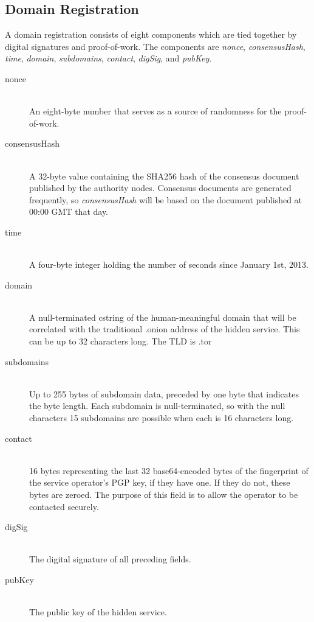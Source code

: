 \documentclass[journal]{IEEEtran}
\begin{document}


\subsection{Domain Registration}

A domain registration consists of eight components which are tied together by digital signatures and proof-of-work. The components are \textit{nonce}, \textit{consensusHash}, \textit{time}, \textit{domain}, \textit{subdomains}, \textit{contact}, \textit{digSig}, and \textit{pubKey}.

\begin{description}
	\item[nonce] \hfill \\
		An eight-byte number that serves as a source of randomness for the proof-of-work.
	\item[consensusHash] \hfill \\
		A 32-byte value containing the SHA256 hash of the consensus document published by the authority nodes. Consensus documents are generated frequently, so \textit{consensusHash} will be based on the document published at 00:00 GMT that day.
	\item[time] \hfill \\
		A four-byte integer holding the number of seconds since January 1st, 2013.
	\item[domain] \hfill \\
		A null-terminated cstring of the human-meaningful domain that will be correlated with the traditional .onion address of the hidden service. This can be up to 32 characters long. The TLD is .tor
	\item[subdomains] \hfill \\
		Up to 255 bytes of subdomain data, preceded by one byte that indicates the byte length. Each subdomain is null-terminated, so with the null characters 15 subdomains are possible when each is 16 characters long.
	\item[contact] \hfill \\
		16 bytes representing the last 32 base64-encoded bytes of the fingerprint of the service operator's PGP key, if they have one. If they do not, these bytes are zeroed. The purpose of this field is to allow the operator to be contacted securely.
	\item[digSig] \hfill \\
		The digital signature of all preceding fields.
	\item[pubKey] \hfill \\
		The public key of the hidden service.
\end{description}
\end{document}
